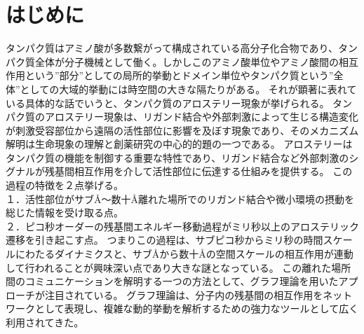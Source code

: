 \section{はじめに}

タンパク質はアミノ酸が多数繋がって構成されている高分子化合物であり、タンパク質全体が分子機械として働く。しかしこのアミノ酸単位やアミノ酸間の相互作用という”部分”としての局所的挙動とドメイン単位やタンパク質という”全体”としての大域的挙動には時空間の大きな隔たりがある。
それが顕著に表れている具体的な話でいうと、タンパク質のアロステリー現象が挙げられる。
タンパク質のアロステリー現象は、リガンド結合や外部刺激によって生じる構造変化が刺激受容部位から遠隔の活性部位に影響を及ぼす現象であり、そのメカニズム解明は生命現象の理解と創薬研究の中心的的題の一つである。
アロステリーはタンパク質の機能を制御する重要な特性であり\cite{Cui2009}、リガンド結合など外部刺激のシグナルが残基間相互作用を介して活性部位に伝達する仕組みを提供する。
この過程の特徴を２点挙げる。\\
１．活性部位がサブÅ～数十Å離れた場所でのリガンド結合や微小環境の摂動を総じた情報を受け取る点。\\
２．ピコ秒オーダーの残基間エネルギー移動過程\cite{Lim1996}がミリ秒以上のアロステリック遷移\cite{Changeux2005}を引き起こす点。
つまりこの過程は、サブピコ秒からミリ秒の時間スケールにわたるダイナミクスと、サブÅから数十Åの空間スケールの相互作用が連動して行われることが興味深い点であり大きな謎\cite{Fenton2008}となっている。
この離れた場所間のコミュニケーションを解明する一つの方法として、グラフ理論\cite{Zhou2018}を用いたアプローチが注目されている。
グラフ理論は、分子内の残基間の相互作用をネットワークとして表現し、複雑な動的挙動を解析するための強力なツールとして広く利用されてきた\cite{Doncheva2011}\cite{Martin2011}\cite{Doncheva2012}。
